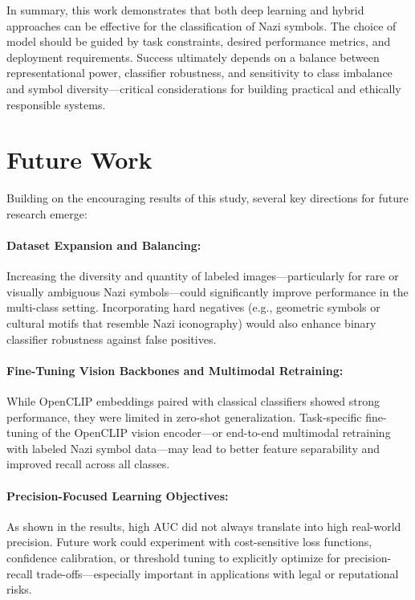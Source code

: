 In summary, this work demonstrates that both deep learning and hybrid approaches can be effective for the
classification of Nazi symbols. The choice of model should be guided by task constraints, desired performance
metrics, and deployment requirements. Success ultimately depends on a balance between representational power,
classifier robustness, and sensitivity to class imbalance and symbol diversity—critical considerations for building
practical and ethically responsible systems.


\section{Future Work}

Building on the encouraging results of this study, several key directions for future research emerge:

\paragraph{Dataset Expansion and Balancing:}

Increasing the diversity and quantity of labeled
images—particularly for rare or visually ambiguous Nazi symbols—could significantly improve performance in the
multi-class setting. Incorporating hard negatives (e.g., geometric symbols or cultural motifs that resemble Nazi
iconography) would also enhance binary classifier robustness against false positives.

\paragraph{Fine-Tuning Vision Backbones and Multimodal Retraining:}
While OpenCLIP embeddings paired with
classical classifiers showed strong performance, they were limited in zero-shot generalization. Task-specific
fine-tuning of the OpenCLIP vision encoder—or end-to-end multimodal retraining with labeled Nazi symbol data—may
lead to better feature separability and improved recall across all classes.

\paragraph{Precision-Focused Learning Objectives:}
As shown in the results, high \ac{AUC} did not always
translate into high real-world precision. Future work could experiment with cost-sensitive loss functions,
confidence calibration, or threshold tuning to explicitly optimize for precision-recall trade-offs—especially
important in applications with legal or reputational risks.

